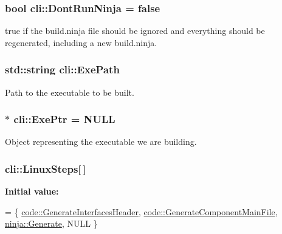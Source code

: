 \subsubsection[{\texorpdfstring{Dont\+Run\+Ninja}{DontRunNinja}}]{\setlength{\rightskip}{0pt plus 5cm}bool cli\+::\+Dont\+Run\+Ninja = false\hspace{0.3cm}{\ttfamily [static]}}\hypertarget{namespacecli_a9aa7b41991b7a654aeaad913f5a2c257}{}\label{namespacecli_a9aa7b41991b7a654aeaad913f5a2c257}
true if the build.\+ninja file should be ignored and everything should be regenerated, including a new build.\+ninja. 
\subsubsection[{\texorpdfstring{Exe\+Path}{ExePath}}]{\setlength{\rightskip}{0pt plus 5cm}std\+::string cli\+::\+Exe\+Path\hspace{0.3cm}{\ttfamily [static]}}\hypertarget{namespacecli_a5281170d5e6e43095a9c168bc48694c2}{}\label{namespacecli_a5281170d5e6e43095a9c168bc48694c2}


Path to the executable to be built. 

\subsubsection[{\texorpdfstring{Exe\+Ptr}{ExePtr}}]{$\ast$ cli\+::\+Exe\+Ptr = N\+U\+LL\hspace{0.3cm}{\ttfamily [static]}}\hypertarget{namespacecli_a06731ece22b0ce727e879563be534c1f}{}\label{namespacecli_a06731ece22b0ce727e879563be534c1f}


Object representing the executable we are building. 

\subsubsection[{\texorpdfstring{Linux\+Steps}{LinuxSteps}}]{ cli\+::\+Linux\+Steps\mbox{[}$\,$\mbox{]}\hspace{0.3cm}{\ttfamily [static]}}\hypertarget{namespacecli_aa965937b0e79f800d22c09a21db1d6b0}{}\label{namespacecli_aa965937b0e79f800d22c09a21db1d6b0}
{\bfseries Initial value\+:}
\begin{DoxyCode}
=
\{
    \hyperlink{namespacecode_a41e2f81a72485fb39ef74fe902d822b7}{code::GenerateInterfacesHeader},
    \hyperlink{namespacecode_a54182e3c94ba57ad83516f0abeb2be8b}{code::GenerateComponentMainFile},
    \hyperlink{namespaceninja_a09e306ee7633de552e4384a80ede442f}{ninja::Generate},
    NULL
\}
\end{DoxyCode}
